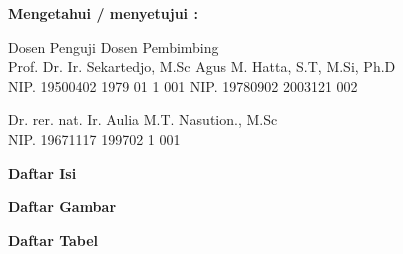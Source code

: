 \documentclass[12pt]{article}
\begin{document}
	\begin{center}
		\textbf{Mengetahui / menyetujui :}
	\end{center}

	
	\begin{center}
		Dosen Penguji \hspace{150pt} Dosen Pembimbing \\
		Prof. Dr. Ir. Sekartedjo, M.Sc \hspace{75pt} Agus M. Hatta, S.T, M.Si, Ph.D \\
		NIP. 19500402 1979 01 1 001 \hspace{85pt} NIP. 19780902 2003121 002 \\
	\end{center}

	\vspace{75pt}	
	
	\begin{flushleft}
		Dr. rer. nat. Ir. Aulia M.T. Nasution., M.Sc \\
		NIP. 19671117 199702 1 001
	\end{flushleft}

\newpage
\thispagestyle{plain}
\mbox{}

\newpage

	\begin{center}
		\textbf{{\large Daftar Isi}}
	\end{center}
	
	\tableofcontents

\newpage
\thispagestyle{plain}
\mbox{}

\newpage

	\begin{center}
		\textbf{{\large Daftar Gambar}}
	\end{center}

	\listoffigures

\newpage
\thispagestyle{plain}
\mbox{}

\newpage

	\begin{center}
		\textbf{{\large Daftar Tabel}}
	\end{center}
\end{document}
